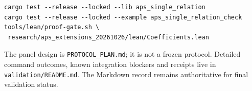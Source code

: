 \documentclass[10pt]{article}
\begin{document}
\begin{verbatim}
cargo test --release --locked --lib aps_single_relation
cargo test --release --locked --example aps_single_relation_check
tools/lean/proof-gate.sh \
 research/aps_extensions_20261026/lean/Coefficients.lean
\end{verbatim}
The panel design is \texttt{PROTOCOL\_PLAN.md}; it is not a frozen protocol.
Detailed command outcomes, known integration blockers and receipts live in
\texttt{validation/README.md}. The Markdown record remains authoritative
for final validation status.
\end{document}
